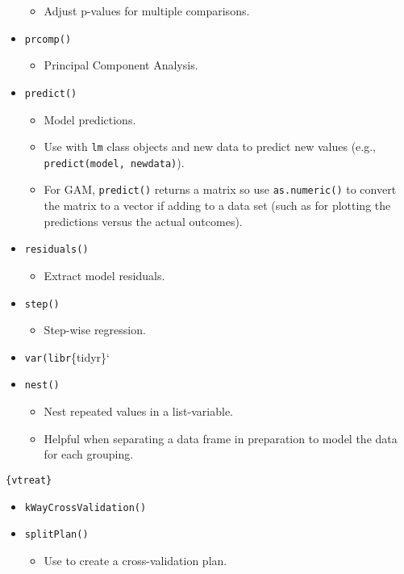 \documentclass[
]{book}
\providecommand{\tightlist}{%
  \setlength{\itemsep}{0pt}\setlength{\parskip}{0pt}}
\begin{document}
\begin{itemize}
  \begin{itemize}
  \tightlist
  \item
    Adjust p-values for multiple comparisons.
  \end{itemize}
\item
  \texttt{prcomp()}

  \begin{itemize}
  \tightlist
  \item
    Principal Component Analysis.
  \end{itemize}
\item
  \texttt{predict()}

  \begin{itemize}
  \tightlist
  \item
    Model predictions.
  \item
    Use with \texttt{lm} class objects and new data to predict new values (e.g., \texttt{predict(model,\ newdata)}).
  \item
    For GAM, \texttt{predict()} returns a matrix so use \texttt{as.numeric()} to convert the matrix to a vector if adding to a data set (such as for plotting the predictions versus the actual outcomes).
  \end{itemize}
\item
  \texttt{residuals()}

  \begin{itemize}
  \tightlist
  \item
    Extract model residuals.
  \end{itemize}
\item
  \texttt{step()}

  \begin{itemize}
  \tightlist
  \item
    Step-wise regression.
  \end{itemize}
\item
  \texttt{var(libr}\{tidyr\}`
\item
  \texttt{nest()}

  \begin{itemize}
  \tightlist
  \item
    Nest repeated values in a list-variable.
  \item
    Helpful when separating a data frame in preparation to model the data for each grouping.
  \end{itemize}
\end{itemize}

\texttt{\{vtreat\}}

\begin{itemize}
\tightlist
\item
  \texttt{kWayCrossValidation()}
\item
  \texttt{splitPlan()}

  \begin{itemize}
  \tightlist
  \item
    Use to create a cross-validation plan.
  \end{itemize}
\end{itemize}
\end{document}
